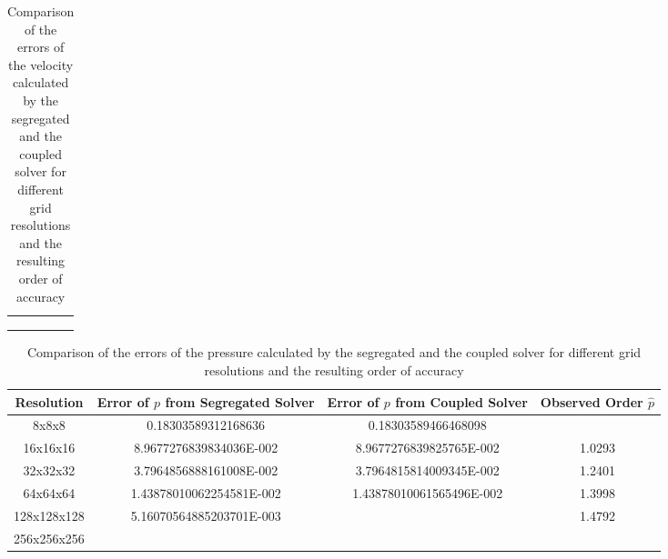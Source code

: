 \begin{table}[h!]
\begin{tabular}{cccc}
    \rowcolor{black!00}\multirow{3}{*}{}             &  & &   \\
    \rowcolor{black!00}                              &  & &   \\
    \rowcolor{black!00} \multirow{-3}{*}{256x256x256}&  & &   \\ %
  \end{tabular}
  \caption{Comparison of the errors of the velocity calculated by the segregated and the coupled solver for different grid resolutions and the resulting order of accuracy}
\end{table}

\begin{table}[h!]\centering
{}
  \begin{tabular}{cccc}\toprule
    Resolution & Error of \(p\) from Segregated Solver & Error of \(p\) from Coupled Solver & Observed Order \(\hat{p}\) \\
    \midrule
    \rowcolor{black!20} 8x8x8       & 0.18303589312168636      &  0.18303589466468098      &        \\%
    \rowcolor{black!00} 16x16x16    & 8.9677276839834036E-002  &  8.9677276839825765E-002  & 1.0293 \\%
    \rowcolor{black!20} 32x32x32    & 3.7964856888161008E-002  &  3.7964815814009345E-002  & 1.2401 \\%
    \rowcolor{black!00} 64x64x64    & 1.43878010062254581E-002 &  1.43878010061565496E-002 & 1.3998 \\%
    \rowcolor{black!20} 128x128x128 & 5.16070564885203701E-003 &                           & 1.4792 \\%
    \rowcolor{black!00} 256x256x256 &                          &                           &        \\%
  \end{tabular}
  \caption{Comparison of the errors of the pressure calculated by the segregated and the coupled solver for different grid resolutions and the resulting order of accuracy}
\end{table}

